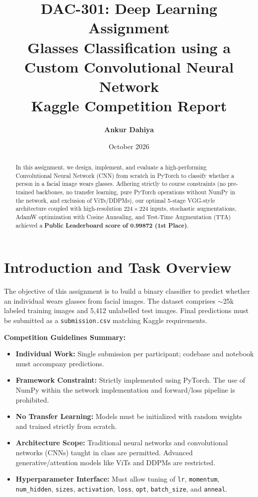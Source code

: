 \documentclass[11pt,a4paper]{article}
\title{
  \vspace{-1.2cm}
  \textbf{\Large DAC-301: Deep Learning Assignment}\\[0.3em]
  \large Glasses Classification using a Custom Convolutional Neural Network\\[0.2em]
  \normalsize Kaggle Competition Report
}
\author{\textbf{Ankur Dahiya}}
\date{October 2026}
\begin{document}
\maketitle
\vspace{-0.6cm}
\begin{abstract}
\noindent In this assignment, we design, implement, and evaluate a high-performing Convolutional Neural Network (CNN) from scratch in PyTorch to classify whether a person in a facial image wears glasses. Adhering strictly to course constraints (no pre-trained backbones, no transfer learning, pure PyTorch operations without NumPy in the network, and exclusion of ViTs/DDPMs), our optimal 5-stage VGG-style architecture coupled with high-resolution $224\times 224$ inputs, stochastic augmentations, AdamW optimization with Cosine Annealing, and Test-Time Augmentation (TTA) achieved a \textbf{Public Leaderboard score of 0.99872 (1st Place)}.
\end{abstract}
\vspace{-0.2cm}

\section{Introduction and Task Overview}
The objective of this assignment is to build a binary classifier to predict whether an individual wears glasses from facial images. The dataset comprises $\sim$25k labeled training images and 5,412 unlabelled test images. Final predictions must be submitted as a \texttt{submission.csv} matching Kaggle requirements.

\textbf{Competition Guidelines Summary:}
\begin{itemize}
  \item \textbf{Individual Work:} Single submission per participant; codebase and notebook must accompany predictions.
  \item \textbf{Framework Constraint:} Strictly implemented using PyTorch. The use of NumPy within the network implementation and forward/loss pipeline is prohibited.
  \item \textbf{No Transfer Learning:} Models must be initialized with random weights and trained strictly from scratch.
  \item \textbf{Architecture Scope:} Traditional neural networks and convolutional networks (CNNs) taught in class are permitted. Advanced generative/attention models like ViTs and DDPMs are restricted.
  \item \textbf{Hyperparameter Interface:} Must allow tuning of \texttt{lr}, \texttt{momentum}, \texttt{num\_hidden}, \texttt{sizes}, \texttt{activation}, \texttt{loss}, \texttt{opt}, \texttt{batch\_size}, and \texttt{anneal}.
\end{itemize}
\end{document}
